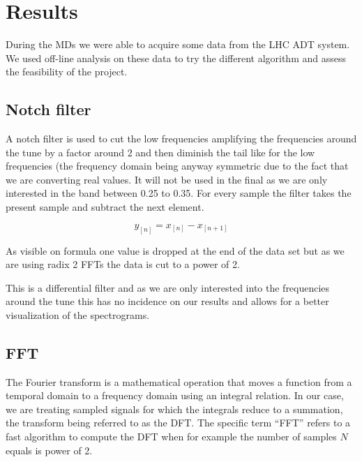 %

\chapter{Results}

During the \glspl{MD} we were able to acquire some data from the \gls{LHC} \gls{ADT} system. We used off-line analysis on these data to try the different algorithm and assess the feasibility of the project.

\section{Notch filter}
\label{sec:notch}

A notch filter is used to cut the low frequencies amplifying the frequencies around the tune by a factor around 2 and then diminish the tail like for the low frequencies (the frequency domain being anyway symmetric due to the fact that we are converting real values. It will not be used in the final as we are only interested in the band between 0.25 to 0.35. For every sample the filter takes the present sample and subtract the next element. 

$$y_{[n]} = x_{[n]} - x_{[n + 1]}$$

As visible on formula one value is dropped at the end of the data set but as we are using radix 2 \glspl{FFT} the data is cut to a power of 2.

This is a differential filter and as we are only interested into the frequencies around the tune this has no incidence on our results and allows for a better visualization of the spectrograms.

\section{FFT}
\label{sec:FFT}

The Fourier transform is a mathematical operation that moves a function from a temporal domain to a frequency domain using an integral relation. In our case, we are treating sampled signals for which the integrals reduce to a summation, the transform being referred to as the \gls{DFT}. The specific term ``\gls{FFT}'' refers to a fast algorithm to compute the \gls{DFT} when for example the number of samples $N$ equals is power of 2.

